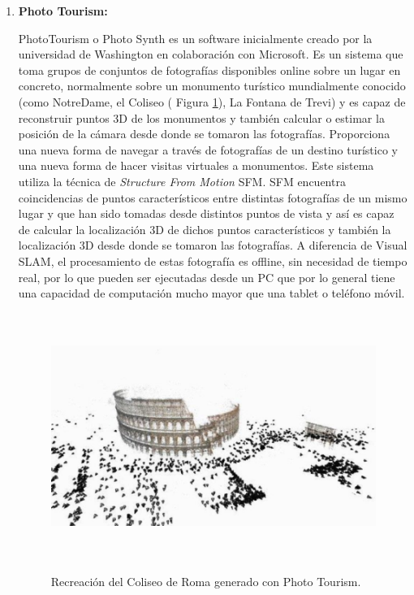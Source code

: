 \begin {enumerate}
\item \textbf{Photo Tourism:}

PhotoTourism o Photo Synth es un software inicialmente creado por la universidad de  Washington en colaboración con Microsoft. Es un sistema que toma grupos de conjuntos de fotografías disponibles online sobre un lugar en concreto, normalmente sobre un monumento turístico mundialmente conocido (como NotreDame, el Coliseo ( Figura \ref{fig:Coliseo}), La Fontana de Trevi) y es capaz de reconstruir puntos 3D de los monumentos y también calcular o estimar la posición de la cámara desde donde se tomaron las fotografías. Proporciona una nueva forma de navegar a través de fotografías de un destino turístico y una nueva forma de hacer visitas virtuales a monumentos.
Este sistema utiliza la técnica de \textit {Structure From Motion} SFM. SFM encuentra coincidencias de  puntos característicos entre distintas fotografías de un mismo lugar y que han sido tomadas desde distintos puntos de vista y así es capaz de calcular la localización 3D de dichos puntos característicos y también la localización 3D desde donde se tomaron las fotografías.
A diferencia de Visual SLAM, el procesamiento de estas fotografía es offline, sin necesidad de tiempo real, por lo que pueden ser ejecutadas desde un PC que por lo general tiene una capacidad de computación mucho mayor que una tablet o teléfono móvil.

\begin{figure}[htbp]
\begin{center}
\label{fig:Coliseo}\includegraphics[height=8.0cm]{img/cap2/PhotoTourism.jpg}
\end{center}
\caption{Recreación del Coliseo de Roma generado con Photo Tourism. }
\end{figure}


\end{enumerate}
